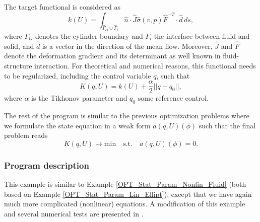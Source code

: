 The target functional is considered as 
\[
k(U) = \int_{\hat\Gamma_O \cup \hat\Gamma_i} \hat n\cdot \hat J\hat\sigma(v,p)\hat
F^{-T} \cdot \hat d \, ds,
\]
where $\Gamma_O$ denotes the cylinder boundary and $\Gamma_i$ the 
interface between fluid and solid, and $\hat d$ is a vector in the
direction
of the mean flow. Moreover, $\hat J$ and $\hat F$ denote the deformation 
gradient and its determinant as well known in fluid-structure interaction.
For theoretical and numerical reasons, this functional 
needs to be regularized, including the control variable $q$, such that
\[
K(q,U) = k(U) + \frac{\alpha}{2}||q - q_0||,
\] 
where $\alpha$ is the Tikhonov parameter and $q_0$ some 
reference control. 

The rest of the program is similar to the previous optimization problems where
we formulate the state equation in a weak form $a(q,U)(\phi)$ such that the 
final problem reads
\[
K(q,U) \rightarrow \text{min} \quad \text{s.t.} \quad a(q,U)(\phi) = 0.
\]

\subsubsection{Program description}
This example is similar to Example \ref{OPT_Stat_Param_Nonlin_Fluid} (both 
based on Example \ref{OPT_Stat_Param_Lin_Ellipt}), except that we 
have again much more complicated (nonlinear) equations. A modification 
of this example and several numerical tests are presented 
in \cite{RiWi13_fsi_opt}.






